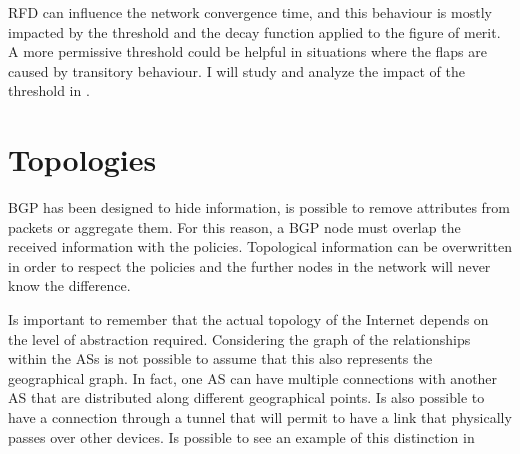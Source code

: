 \ac{RFD} can influence the network convergence time, and this behaviour is
mostly impacted by the threshold and the decay function applied to the figure
of merit.
A more permissive threshold could be helpful in situations where the flaps are
caused by transitory behaviour.
I will study and analyze the impact of the threshold in .


\section{Topologies}
\label{sec:topologies}

\ac{BGP} has been designed to hide information, is possible to remove attributes
from packets or aggregate them.
For this reason, a \ac{BGP} node must overlap the received information with the
policies.
Topological information can be overwritten in order to respect the policies and
the further nodes in the network will never know the difference.

Is important to remember that the actual topology of the Internet depends on the
level of abstraction required.
Considering the graph of the relationships within the \acp{AS} is not
possible to assume that this also represents the geographical graph.
In fact, one \ac{AS} can have multiple connections with another \ac{AS}
that are distributed along different geographical points.
Is also possible to have a connection through a tunnel that will permit to have
a link that physically passes over other devices.
Is possible to see an example of this distinction in 

